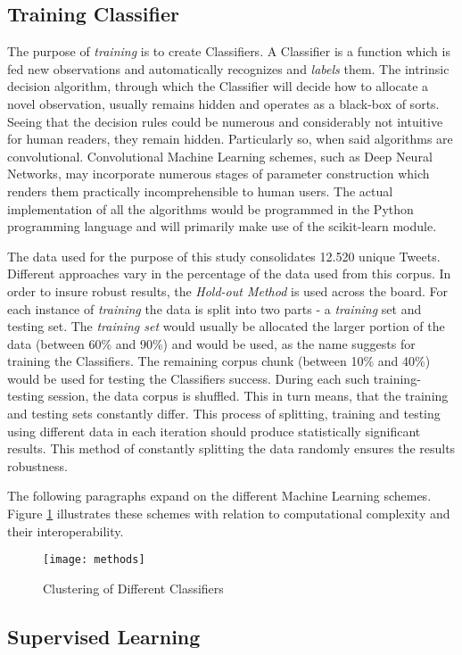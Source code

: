 	\subsection{Training Classifier}
	The purpose of \textit{training} is to create Classifiers. A Classifier is a function which is fed  new observations and automatically recognizes and \textit{labels} them. The intrinsic decision algorithm, through which the Classifier will decide how to allocate a novel observation, usually remains hidden and operates as a black-box of sorts. Seeing that the decision rules could be numerous and considerably not intuitive for human readers, they remain hidden. Particularly so, when said algorithms are convolutional. Convolutional Machine Learning schemes, such as Deep Neural Networks, may incorporate numerous stages of parameter construction which renders them practically incomprehensible to human users. The actual implementation of all the algorithms would be programmed in the Python programming language and will primarily make use of the scikit-learn\cite{scikit-learn} module.
	\par
	The data used for the purpose of this study consolidates 12.520 unique Tweets. Different approaches vary in the percentage of the data used from this corpus. In order to insure robust results, the \textit{Hold-out Method} is used across the board. For each instance of \textit{training} the data is split into two parts - a \textit{training} set and testing set. The \textit{training set} would usually be allocated the larger portion of the data (between 60\% and 90\%) and would be used, as the name suggests for training the Classifiers. The remaining corpus chunk (between 10\% and 40\%) would be used for testing the Classifiers success. During each such training-testing session, the data corpus is shuffled. This in turn means, that the training and testing sets constantly differ. This process of splitting, training and testing using different data in each iteration should produce statistically significant results. This method of constantly splitting the data randomly ensures the results robustness.
	\par
	The following paragraphs expand on the different Machine Learning schemes. Figure \ref{fig:classifier_matrix} illustrates these schemes with relation to computational complexity and their interoperability.
	
	\begin{figure}[h]
		\centering
		\texttt{[image: methods]}
		\captionsetup{width=0.8\textwidth}
		\caption{Clustering of Different Classifiers}
		\label{fig:classifier_matrix}
	\end{figure}
	
	\subsection{Supervised Learning}
	\label{classifer_types}
	
	
	
	
	
	

	
	
	
	
	
	
	
	
	
	
	
	
		
	